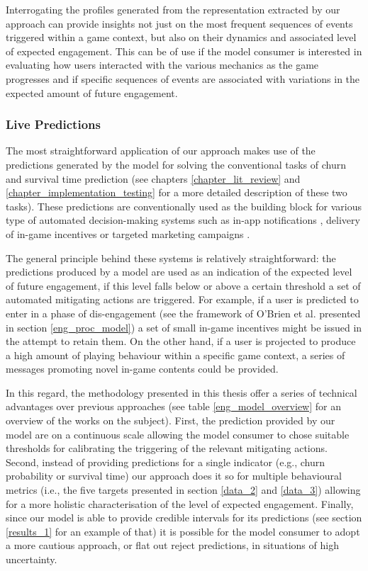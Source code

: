 Interrogating the profiles generated from the representation extracted by our approach can provide insights not just on the most frequent sequences of events triggered within a game context, but also on their dynamics and associated level of expected engagement. This can be of use if the model consumer is interested in evaluating how users interacted with the various mechanics as the game progresses \cite{sifa2013behavior, makarovych2018like} and if specific sequences of events are associated with variations in the expected amount of future engagement. 

\subsubsection{Live Predictions}
The most straightforward application of our approach makes use of the predictions generated by the model for solving the conventional tasks of churn and survival time prediction (see chapters \ref{chapter_lit_review} and \ref{chapter_implementation_testing} for a more detailed description of these two tasks). These predictions are conventionally used as the building block for various type of automated decision-making systems such as in-app notifications \cite{milovsevic2017early}, delivery of in-game incentives or targeted marketing campaigns \cite{el2016game, el2021game}. 

The general principle behind these systems is relatively straightforward: the predictions produced by a model are used as an indication of the expected level of future engagement, if this level falls below or above a certain threshold a set of automated mitigating actions are triggered. For example, if a user is predicted to enter in a phase of dis-engagement (see the framework of O'Brien et al. presented in section \ref{eng_proc_model}) a set of small in-game incentives might be issued in the attempt to retain them. On the other hand, if a user is projected to produce a high amount of playing behaviour within a specific game context, a series of messages promoting novel in-game contents could be provided.

In this regard, the methodology presented in this thesis offer a series of technical advantages over previous approaches (see table \ref{eng_model_overview} for an overview of the works on the subject). First, the prediction provided by our model are on a continuous scale allowing the model consumer to chose suitable thresholds for calibrating the triggering of the relevant mitigating actions. Second, instead of providing predictions for a single indicator (e.g., churn probability or survival time) our approach does it so for multiple behavioural metrics (i.e., the five targets presented in section \ref{data_2} and \ref{data_3}) allowing for a more holistic characterisation of the level of expected engagement. Finally, since our model is able to provide credible intervals for its predictions (see section \ref{results_1} for an example of that) it is possible for the model consumer to adopt a more cautious approach, or flat out reject predictions, in situations of high uncertainty.


